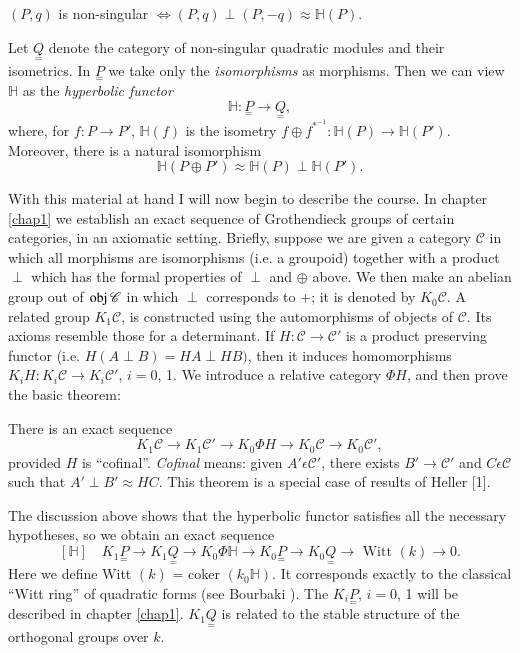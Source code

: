 $(P, q)$ is non-singular $\Leftrightarrow (P, q) \perp (P, -q) \approx
\mathbb{H}(P)$. 

Let $\underset{=}Q$ denote the category of non-singular quadratic
modules and their isometrics. In $\underset{=}P$ we take only the
\textit{isomorphisms} as morphisms. Then we can view $\mathbb{H}$ as
the \textit{hyperbolic functor} 
$$
\mathbb{H} : \underset{=}P \to \underset{=}Q, 
$$
where, for $f: P \to P'$, $\mathbb{H}(f)$ is the isometry $ f \oplus
f^{*^{-1}}: \mathbb{H} (P) \to \mathbb{H} (P')$. Moreover, there is a
natural isomorphism 
$$
\mathbb{H} (P \oplus P') \approx \mathbb{H} (P) \perp \mathbb{H} 
(P'). 
$$

With this material at hand I will now begin to describe the course. In
chapter \ref{chap1} we establish an exact sequence of Grothendieck groups of
certain categories, in an axiomatic setting. Briefly, suppose we are
given a category $\mathscr{C}$ in which all morphisms are isomorphisms
\pageoriginale 
(i.e. a groupoid) together with a product $\perp$ which has the formal
properties of $\perp$  and $\oplus$ above.  We then make an abelian
group out of $\operatorname{obj} \mathscr{C}$ in which $\perp$ corresponds to $+$; it
is denoted by $K_0 \mathscr{C}$. A related group $K_1 \mathscr{C}$, is
constructed using the automorphisms of objects of $\mathscr{C}$. Its
axioms resemble those for a determinant. If $H: \mathscr{C} \to
\mathscr{C}'$ is a product preserving functor (i.e. $H (A \perp B) =
HA \perp HB)$, then it induces homomorphisms $K_i H : K_i \mathscr{C}
\to K_i \mathscr{C}'$, $i = 0$, 1. We introduce a relative category
$\Phi H$, and then prove the basic theorem: 

There is an exact sequence
$$
K_1 \mathscr{C} \to K_1 \mathscr{C}' \to K_0 \Phi H \to K_0 
\mathscr{C} \to K_0 \mathscr{C}', 
$$
provided $H$ is ``cofinal''. \textit{Cofinal} means: given $A'
\epsilon \mathscr{C}'$, there exists $B' \to \mathscr{C}'$ and $C
\epsilon \mathscr{C}$ such that $A' \perp B' \approx HC$. This theorem
is a special case of results of Heller [1]. 

The discussion above shows that the hyperbolic functor satisfies all
the necessary hypotheses, so we obtain an exact sequence 
$$
[\mathbb{H}] \quad K_1 \underset{=}P \to K_1 \underset{=}Q \to K_0
\Phi \mathbb{H} \to  K_0 \underset{=}P \to K_0 \underset{=}Q \to
\text{ Witt } (k) \to 0. 
$$
Here we define  Witt $(k)$ = coker $(k_0 \mathbb{H})$. It corresponds
exactly to the classical ``Witt ring'' of quadratic forms (see
Bourbaki \cite{key2}). The $K_i \underset{=}P$, $i = 0$, 1 will be described
in chapter \ref{chap1}. $K_1 \underset{=}Q$ is related to the stable structure
of the orthogonal groups over $k$. 

